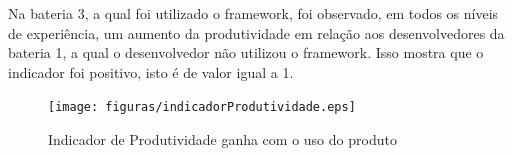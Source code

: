 Na bateria 3, a qual foi utilizado o framework, foi observado, em todos os níveis de experiência, um aumento da
produtividade em relação aos desenvolvedores da bateria 1, a qual o desenvolvedor não utilizou o framework. Isso
mostra que o indicador foi positivo, isto é de valor igual a 1.

\begin{figure}[H]
  \centering
  \label{fig:indicador1}
  \texttt{[image: figuras/indicadorProdutividade.eps]}
  \caption{Indicador de Produtividade ganha com o uso do produto}
\end{figure}
